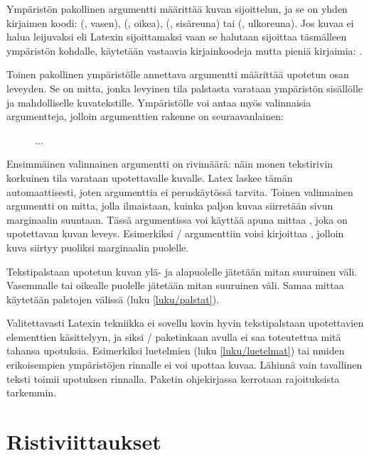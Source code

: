 \noindent
Ympäristön pakollinen argumentti  määrittää kuvan
sijoittelun, ja se on yhden kirjaimen koodi:  (,
vasen),  (, oikea), 
(, sisäreuna) tai  (,
ulkoreuna). Jos kuvaa ei halua leijuvaksi eli Latexin sijoittamaksi vaan
se halutaan sijoittaa täsmälleen ympäristön kohdalle, käytetään
vastaavia kirjainkoodeja mutta pieniä kirjaimia: .

Toinen pakollinen ympäristölle annettava argumentti 
määrittää upotetun osan leveyden. Se on mitta, jonka levyinen tila
palstasta varataan ympäristön sisällölle ja mahdolliselle kuvatekstille.
Ympäristölle voi antaa myös valinnaisia argumentteja, jolloin
argumenttien rakenne on seuraavanlainen:

\begin{koodilohkosis}
\begin{figure}
  ...
\end{figure}
\end{koodilohkosis}

\noindent
Ensimmäinen valinnainen argumentti  on rivimäärä: näin
monen tekstirivin korkuinen tila varataan upotettavalle kuvalle. Latex
laskee tämän automaattisesti, joten argumenttia ei peruskäytössä
tarvita. Toinen valinnainen argumentti  on mitta, jolla
ilmaistaan, kuinka paljon kuvaa siirretään sivun marginaalin suuntaan.
Tässä argumentissa voi käyttää apuna mittaa , joka on
upotettavan kuvan leveys. Esimerkiksi \-/ argumenttiin
voisi kirjoittaa , jolloin kuva siirtyy puoliksi
marginaalin puolelle.

Tekstipalstaan upotetun kuvan ylä- ja alapuolelle jätetään mitan
 suuruinen väli. Vasemmalle tai oikealle puolelle
jätetään mitan  suuruinen väli. Samaa mittaa käytetään
palstojen välissä (luku \ref{luku/palstat}).

Valitettavasti Latexin tekniikka ei sovellu kovin hyvin tekstipalstaan
upotettavien elementtien käsittelyyn, ja siksi \-/
paketinkaan avulla ei saa toteutettua mitä tahansa upotuksia.
Esimerkiksi luetelmien (luku \ref{luku/luetelmat}) tai muiden
erikoisempien ympäristöjen rinnalle ei voi upottaa kuvaa. Lähinnä vain
tavallinen teksti toimii upotuksen rinnalla. Paketin ohjekirjassa
kerrotaan rajoituksista tarkemmin.

\section{Ristiviittaukset}
\label{luku/ristiviitteet}

